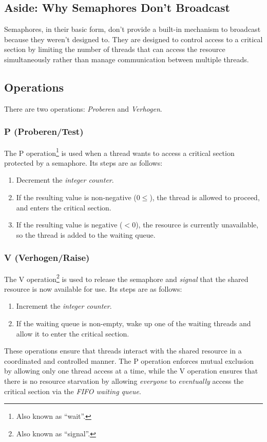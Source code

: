\documentclass{report}
\begin{document}
\subsection*{Aside: Why Semaphores Don't Broadcast}
Semaphores, in their basic form, don't provide a built-in mechanism to broadcast because they
weren't designed to. They are designed to control access to a critical section by limiting the
number of threads that can access the resource simultaneously rather than manage communication
between multiple threads.  


\subsection{Operations}
There are two operations: \textit{Proberen} and \textit{Verhogen}.


\subsubsection{P (Proberen/Test)}
The P operation\footnote{Also known as ``wait''.} is used when a thread wants to access a critical
section protected by a semaphore. Its steps are as follows:

\begin{enumerate}[label=\textit{(\roman*)}]
\item Decrement the \textit{integer counter}.
\item If the resulting value is non-negative ($0 \leq$), the thread is allowed to proceed, and
  enters the critical section.
\item If the resulting value is negative ($< 0$), the resource is currently unavailable, so the
  thread is added to the waiting queue.
\end{enumerate}

\subsubsection{V (Verhogen/Raise)}
The V operation\footnote{Also known as ``signal''.} is used to release the semaphore and
\textit{signal} that the shared resource is now available for use. Its steps are as follows:

\begin{enumerate}[label=\textit{(\roman*)}]
\item Increment the \textit{integer counter}.
\item If the waiting queue is non-empty, wake up one of the waiting threads and allow it to enter
  the critical section.
\end{enumerate}
These operations ensure that threads interact with the shared resource in a coordinated and
controlled manner. The P operation enforces mutual exclusion by allowing only one thread access at a
time, while the V operation ensures that there is no resource starvation by allowing
\textit{everyone} to \textit{eventually} access the critical section via the \textit{FIFO waiting queue}.
\end{document}
